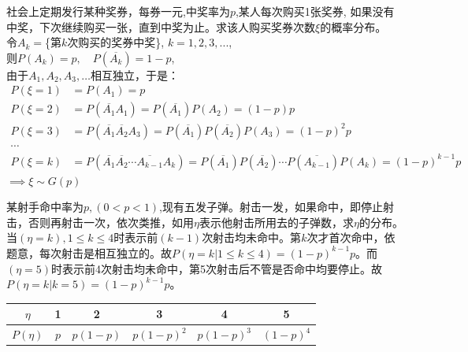 \begin{frame}
\begin{example}
	社会上定期发行某种奖券，每券一元,中奖率为$p$,某人每次购买1张奖券, 如果没有中奖，下次继续购买一张，直到中奖为止。求该人购买奖券次数$\xi$的概率分布。\\
	令$A_k=$\{第$k$次购买的奖券中奖\}, $k=1,2,3,...$, \\
	则$P(A_k)=p,\quad P(\overline{A_k})=1-p$, \\
	由于$A_1,A_2,A_3,\dots$相互独立，于是：
	\begin{align*}
	P(\xi=1)&=P(A_1)=p\\
	P(\xi=2)&=P(\overline{A_1}A_1)=P(\overline{A_1})P(A_2)=(1-p)p\\
	P(\xi=3)&=P(\overline{A_1}\overline{A_2}A_3)=P(\overline{A_1})P(\overline{A_2})P(A_3)=(1-p)^{2}p\\
	\cdots\\
	P(\xi=k)&=P(\overline{A_1}\overline{A_2}\cdots\overline{A_{k-1}}A_k)=P(\overline{A_1})P(\overline{A_2})\cdots P(\overline{A_{k-1}})P(A_k)=(1-p)^{k-1}p
	\end{align*}
	$\implies \xi\sim G(p)$
\end{example}
\end{frame}

\begin{frame}
\begin{example}
	某射手命中率为$p,(0<p<1)$,现有五发子弹。射击一发，如果命中，即停止射击，否则再射击一次，依次类推，如用$\eta$表示他射击所用去的子弹数，求$\eta$的分布。\\
	当$(\eta=k),1\le k\le 4$时表示前$(k-1)$次射击均未命中。第$k$次才首次命中，依题意，每次射击是相互独立的。故$P(\eta=k| 1\le k\le 4)=(1-p)^{k-1}p$。而$(\eta=5)$时表示前4次射击均未命中，第5次射击后不管是否命中均要停止。故$P(\eta=k|k=5)=(1-p)^{k-1}p$。\\
	\begin{tabular}{|c|c|c|c|c|c|}
		\hline 
		$\eta$ & 1 & 2 & 3 & 4 & 5\\ 
		\hline 
		$P(\eta)$ & $p$ & $p(1-p)$ & $p(1-p)^2$ & $p(1-p)^3$  & $(1-p)^4$ \\ 
		\hline 
	\end{tabular} 
\end{example}
\end{frame}

\fi　　　%
